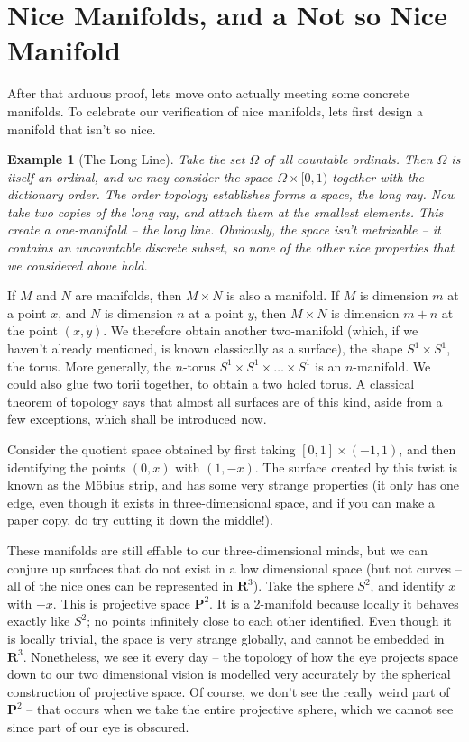 \documentclass[12pt]{report}
\theoremstyle{plain}
\newtheorem*{example}{Example}
\theoremstyle{definition}
\begin{document}
\section{Nice Manifolds, and a Not so Nice Manifold}

After that arduous proof, lets move onto actually meeting some concrete manifolds. To celebrate our verification of nice manifolds, lets first design a manifold that isn't so nice.

\begin{example}[The Long Line]
    Take the set $\Omega$ of all countable ordinals. Then $\Omega$ is itself an ordinal, and we may consider the space $\Omega \times [0,1)$ together with the dictionary order. The order topology establishes forms a space, the long ray. Now take two copies of the long ray, and attach them at the smallest elements. This create a one-manifold -- the long line. Obviously, the space isn't metrizable -- it contains an uncountable discrete subset, so none of the other nice properties that we considered above hold.
\end{example}

If $M$ and $N$ are manifolds, then $M \times N$ is also a manifold. If $M$ is dimension $m$ at a point $x$, and $N$ is dimension $n$ at a point $y$, then $M \times N$ is dimension $m + n$ at the point $(x,y)$. We therefore obtain another two-manifold (which, if we haven't already mentioned, is known classically as a surface), the shape $S^1 \times S^1$, the torus. More generally, the $n$-torus $S^1 \times S^1 \times \dots \times S^1$ is an $n$-manifold. We could also glue two torii together, to obtain a two holed torus. A classical theorem of topology says that almost all surfaces are of this kind, aside from a few exceptions, which shall be introduced now.

Consider the quotient space obtained by first taking $[0,1] \times (-1,1)$, and then identifying the points $(0,x)$ with $(1,-x)$. The surface created by this twist is known as the M\"{o}bius strip, and has some very strange properties (it only has one edge, even though it exists in three-dimensional space, and if you can make a paper copy, do try cutting it down the middle!).


These manifolds are still effable to our three-dimensional minds, but we can conjure up surfaces that do not exist in a low dimensional space (but not curves -- all of the nice ones can be represented in $\mathbf{R}^3$). Take the sphere $S^2$, and identify $x$ with $-x$. This is projective space $\mathbf{P}^2$. It is a 2-manifold because locally it behaves exactly like $S^2$; no points infinitely close to each other identified. Even though it is locally trivial, the space is very strange globally, and cannot be embedded in $\mathbf{R}^3$. Nonetheless, we see it every day -- the topology of how the eye projects space down to our two dimensional vision is modelled very accurately by the spherical construction of projective space. Of course, we don't see the really weird part of $\mathbf{P}^2$ -- that occurs when we take the entire projective sphere, which we cannot see since part of our eye is obscured.
\end{document}
